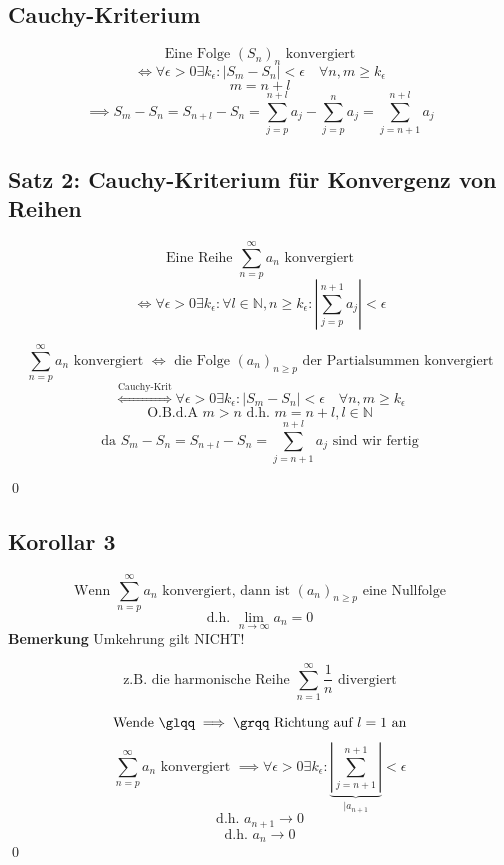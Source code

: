 \documentclass[fleqn]{scrbook}
\newcommand{\mqq}[1]{\text{\glqq} #1\text{\grqq}}
\newcommand{\N}{\mathbb{N}}
\newcommand{\sumOI}{\sum_{n=1}^{\infty}}
\renewenvironment{proof}{{\bfseries Beweis }}{\qed}
\begin{document}
\subsection{Cauchy-Kriterium}

\[\text{Eine Folge } (S_n)_n \text{ konvergiert} \]
\[\Longleftrightarrow \forall \epsilon > 0 \exists k_\epsilon : |S_m -S_n|<\epsilon \quad \forall n,m \geq k_\epsilon\] 
\[m=n+l\]
\[\implies S_m - S_n = S_{n+l} - S_n = \sum_{j=p}^{n+l} a_j -\sum_{j=p}^n a_j = \sum_{j=n+1}^{n+l} a_j\]

\subsection{Satz 2: Cauchy-Kriterium für Konvergenz von Reihen}

\[\text{Eine Reihe } \sum_{n=p}^\infty a_n \text{ konvergiert} \]
\[\Longleftrightarrow \forall \epsilon > 0 \exists k_\epsilon : \forall l \in \N, n \geq k_\epsilon : \left|\sum_{j=p}^{n+1} a_j\right|<\epsilon\]


\begin{proof}
  \[\sum_{n=p}^\infty a_n \text{ konvergiert } \Longleftrightarrow \text{ die Folge } (a_n)_{n\geq p} \text{ der Partialsummen konvergiert}\]
  \[\stackrel{\text{Cauchy-Krit}}{\Longleftrightarrow} \forall \epsilon > 0 \exists k_\epsilon : | S_m -S_n | < \epsilon \quad \forall n,m \geq k_\epsilon\]
  \[\text{O.B.d.A } m>n \text{ d.h. } m=n+l,l\in \N\]
  \[\text{da } S_m-S_n = S_{n+l}- S_n = \sum_{j=n+1}^{n+l} a_j \text{ sind wir fertig}\]

\end{proof}

\subsection{Korollar 3}

\[\text{Wenn } \sum_{n=p}^\infty a_n \text{ konvergiert, dann ist } (a_n)_{n \geq p} \text{ eine Nullfolge} \]
\[\text{d.h. } \lim_{n\to \infty} a_n = 0\]
\textbf{Bemerkung}
Umkehrung gilt NICHT!

\[\text{z.B. die harmonische Reihe } \sumOI \frac{1}{n} \text{ divergiert}\]

\begin{proof}
  \[\text{Wende } \mqq{\implies} \text{ Richtung auf } l=1 \text{ an}\]
  \[\sum_{n=p}^\infty a_n \text{ konvergiert } \implies \forall \epsilon > 0 \exists k_\epsilon : \underbrace{\left| \sum_{j=n+1}^{n+1} \right|}_{|a_{n+1}}<\epsilon\]
  \[\text{d.h. } a_{n+1} \to 0\]
  \[\text{d.h. } a_{n} \to 0\]
\end{proof}
\end{document}
